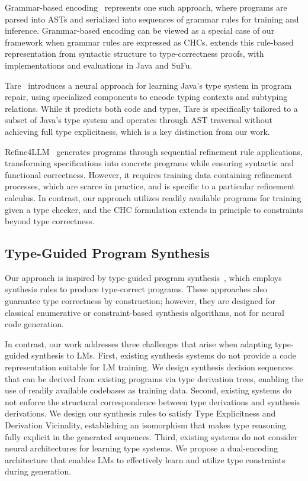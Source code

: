 Grammar-based encoding~\cite{DBLP:conf/acl/YinN17,DBLP:conf/aaai/SunZXSMZ20,DBLP:conf/icse/ZhuL000C24} represents one such approach, where programs are parsed into ASTs and serialized into sequences of grammar rules for training and inference. 
Grammar-based encoding can be viewed as a special case of our framework when grammar rules are expressed as CHCs. \mainname{} extends this rule-based representation from syntactic structure to type-correctness proofs, with implementations and evaluations in Java and SuFu.

Tare~\cite{DBLP:conf/icse/ZhuSZXZ23} introduces a neural approach for learning Java's type system in program repair, using specialized components to encode typing contexts and subtyping relations. While it predicts both code and types, Tare is specifically tailored to a subset of Java's type system and operates through AST traversal without achieving full type explicitness, which is a key distinction from our work.

Refine4LLM~\cite{DBLP:journals/pacmpl/CaiHSLLSD25} generates programs through sequential refinement rule applications, transforming specifications into concrete programs while ensuring syntactic and functional correctness. However, it requires training data containing refinement processes, which are scarce in practice, and is specific to a particular refinement calculus. In contrast, our approach utilizes readily available programs for training given a type checker, and the CHC formulation extends in principle to constraints beyond type correctness.

\subsection{Type-Guided Program Synthesis}
Our approach is inspired by type-guided program synthesis~\cite{DBLP:journals/pacmpl/GuoJJZWJP20, DBLP:conf/pldi/GuriaFH21, DBLP:conf/pldi/PolikarpovaKS16, DBLP:conf/pldi/OseraZ15}, which employs synthesis rules to produce type-correct programs. These approaches also guarantee type correctness by construction; however, they are designed for classical enumerative or constraint-based synthesis algorithms, not for neural code generation.

In contrast, our work addresses three challenges that arise when adapting type-guided synthesis to LMs.
First, existing synthesis systems do not provide a code representation suitable for LM training. We design synthesis decision sequences that can be derived from existing programs via type derivation trees, enabling the use of readily available codebases as training data.
Second, existing systems do not enforce the structural correspondence between type derivations and synthesis derivations. We design our synthesis rules to satisfy Type Explicitness and Derivation Vicinality, establishing an isomorphism that makes type reasoning fully explicit in the generated sequences.
Third, existing systems do not consider neural architectures for learning type systems. We propose a dual-encoding architecture that enables LMs to effectively learn and utilize type constraints during generation.
